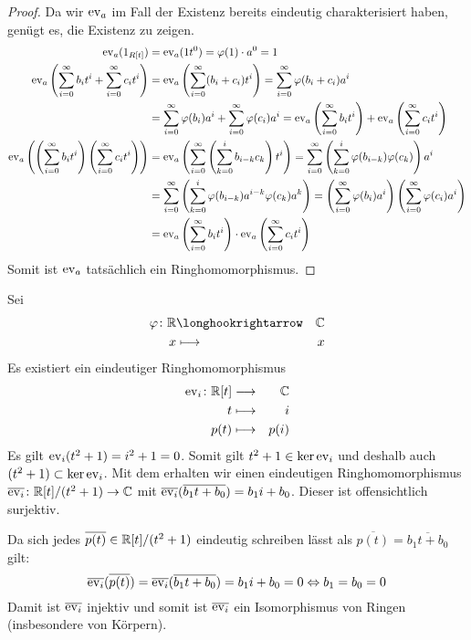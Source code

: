 \documentclass[12pt,a4paper]{scrartcl}
\begin{document}
\begin{proof}
	Da wir $\operatorname{ev}_a$ im Fall der Existenz bereits eindeutig charakterisiert haben, genügt es, die Existenz zu zeigen.
	\begin{align*}
		\operatorname{ev}_a(1_{R[t]}) &= \operatorname{ev}_a(1t^0) = \varphi(1)\cdot a^0 = 1 \\
		\operatorname{ev}_a\left(\sum_{i= 0}^{\infty}b_it^i + \sum_{i = 0}^{\infty}c_it^i\right) &= \operatorname{ev}_a\left(\sum_{i= 0}^{\infty}(b_i+c_i)t^i\right)  = \sum_{i = 0}^{\infty} \varphi(b_i+c_i)a^i \\
		&= \sum_{i = 0}^{\infty} \varphi(b_i)a^i +\sum_{i=0}^{\infty}\varphi(c_i)a^i=\operatorname{ev}_a\left(\sum_{i=0}^{\infty}b_it^i\right) + \operatorname{ev}_a \left(\sum_{i = 0}^{\infty} c_it^i\right) \\
		\operatorname{ev}_a\left(\left(\sum_{i = 0}^{\infty}b_it^i\right)\left(\sum_{i = 0}^{\infty}c_it^i\right)\right) &= \operatorname{ev}_a\left(\sum_{i = 0}^{\infty}\left(\sum_{k = 0}^{i} b_{i-k}c_k\right)t^i\right) = \sum_{i = 0}^{\infty} \left(\sum_{k = 0}^{i}\varphi(b_{i-k})\varphi(c_k)\right)a^i \\
		&= \sum_{i = 0}^{\infty} \left(\sum_{k = 0}^{i}\varphi(b_{i-k})a^{i-k}\varphi(c_k)a^k\right) = \left(\sum_{i = 0}^{\infty} \varphi(b_i)a^i\right)\left(\sum_{i = 0}^{\infty}\varphi(c_i)a^i\right)\\
		& = \operatorname{ev}_a\left(\sum_{i = 0}^{\infty}b_it^i\right)\cdot \operatorname{ev}_a\left(\sum_{i = 0}^{\infty}c_it^i\right)
	\end{align*}
	Somit ist $\operatorname{ev}_a$ tatsächlich ein Ringhomomorphismus.
\end{proof}

\begin{bsp}
	Sei
	\begin{eqnarray*}
		\phi\colon \IR & \longhookrightarrow & \IC\\
		x & \longmapsto & x
	\end{eqnarray*}
	Es existiert ein eindeutiger Ringhomomorphismus
	\begin{eqnarray*}
		\operatorname{ev}_i\colon \mathbb R[t] & \longrightarrow & \mathbb C\\
		t & \longmapsto & i\\
		p(t) & \longmapsto & p(i)
	\end{eqnarray*}
	Es gilt $\operatorname{ev}_i(t^2+1) = i^2 +1 = 0$. Somit gilt $t^2+1\in\operatorname{ker} \operatorname{ev}_i$ und deshalb auch $(t^2+1)\subset \operatorname{ker} \operatorname{ev}_i$. Mit dem  erhalten wir einen eindeutigen Ringhomomorphismus $\overline{\operatorname{ev}_i}\colon \mathbb R[t]/(t^2+1)\to \mathbb C$ mit $\overline{\operatorname{ev}_i}(\overline{b_1t+b_0}) = b_1i+b_0$. Dieser ist offensichtlich surjektiv.
	
	Da sich jedes $\overline{p(t)}\in\mathbb R[t]/(t^2+1)$ eindeutig schreiben lässt als $\overline{p(t)} = \overline{b_1t+b_0}$ gilt:
	$$\overline{\operatorname{ev}_i}(\overline{p(t)}) = \overline{\operatorname{ev}_i}(\overline{b_1t+b_0}) = b_1i +b_0 = 0\Leftrightarrow b_1 = b_0 = 0$$
	Damit ist $\overline{\operatorname{ev}_i}$ injektiv und somit ist $\overline{\operatorname{ev}_i}$ ein Isomorphismus von Ringen (insbesondere von Körpern).
\end{bsp}
\end{document}
